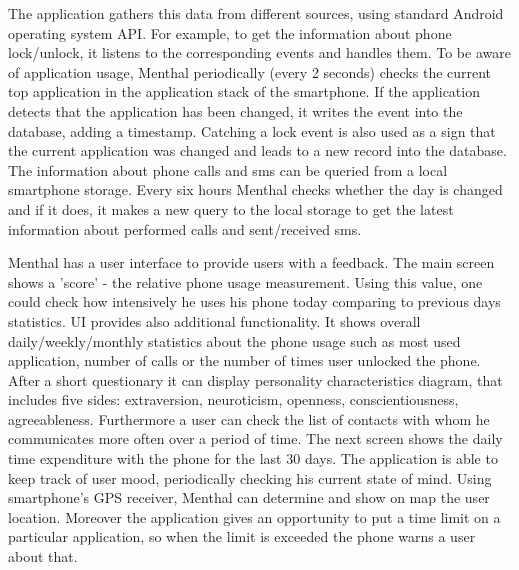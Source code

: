 The application gathers this data from different sources, using standard Android operating system API.
For example, to get the information about phone lock/unlock, it listens to the corresponding events and handles them.
To be aware of application usage, Menthal periodically (every 2 seconds) checks the current top application in the application stack of the smartphone.
If the application detects that the application has been changed, it writes the event into the database, adding a timestamp.
Catching a lock event is also used as a sign that the current application was changed and leads to a new record into the database.
The information about phone calls and sms can be queried from a local smartphone storage.
Every six hours Menthal checks whether the day is changed and if it does, it makes a new query to the local storage to get the latest information about performed calls and sent/received sms. 
 
Menthal has a user interface to provide users with a feedback. 
The main screen shows a 'score' - the relative phone usage measurement.
Using this value, one could check how intensively he uses his phone today comparing to previous days statistics.
UI provides also additional functionality.
It shows overall daily/weekly/monthly statistics about the phone usage such as most used application, number of calls or the number of times user unlocked the phone.
After a short questionary it can display personality characteristics diagram, that includes five sides: extraversion, neuroticism, openness, conscientiousness, agreeableness.
Furthermore a user can check the list of contacts with whom he communicates more often over a period of time.
The next screen shows the daily time expenditure with the phone for the last 30 days.
The application is able to keep track of user mood, periodically checking his current state of mind.
Using smartphone's GPS receiver, Menthal can determine and show on map the user location.
Moreover the application gives an opportunity to put a time limit on a particular application, so when the limit is exceeded the phone warns a user about that.

